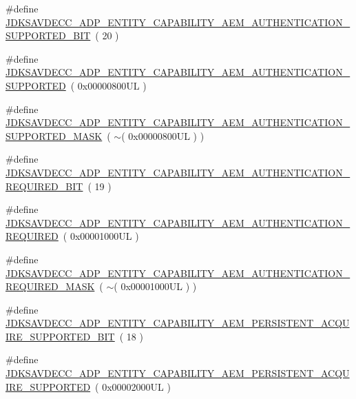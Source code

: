 \begin{DoxyCompactItemize}
\item 
\#define \hyperlink{group__adp__entity__capability_gad508c2d381e82fa1ea17b6751d49966a}{J\+D\+K\+S\+A\+V\+D\+E\+C\+C\+\_\+\+A\+D\+P\+\_\+\+E\+N\+T\+I\+T\+Y\+\_\+\+C\+A\+P\+A\+B\+I\+L\+I\+T\+Y\+\_\+\+A\+E\+M\+\_\+\+A\+U\+T\+H\+E\+N\+T\+I\+C\+A\+T\+I\+O\+N\+\_\+\+S\+U\+P\+P\+O\+R\+T\+E\+D\+\_\+\+B\+IT}~( 20 )
\item 
\#define \hyperlink{group__adp__entity__capability_gaa39be3e8ff394432d2bf6ef5ccbc7677}{J\+D\+K\+S\+A\+V\+D\+E\+C\+C\+\_\+\+A\+D\+P\+\_\+\+E\+N\+T\+I\+T\+Y\+\_\+\+C\+A\+P\+A\+B\+I\+L\+I\+T\+Y\+\_\+\+A\+E\+M\+\_\+\+A\+U\+T\+H\+E\+N\+T\+I\+C\+A\+T\+I\+O\+N\+\_\+\+S\+U\+P\+P\+O\+R\+T\+ED}~( 0x00000800\+U\+L )
\item 
\#define \hyperlink{group__adp__entity__capability_ga5dc48eda67fb232e9af9edaf5d230f7d}{J\+D\+K\+S\+A\+V\+D\+E\+C\+C\+\_\+\+A\+D\+P\+\_\+\+E\+N\+T\+I\+T\+Y\+\_\+\+C\+A\+P\+A\+B\+I\+L\+I\+T\+Y\+\_\+\+A\+E\+M\+\_\+\+A\+U\+T\+H\+E\+N\+T\+I\+C\+A\+T\+I\+O\+N\+\_\+\+S\+U\+P\+P\+O\+R\+T\+E\+D\+\_\+\+M\+A\+SK}~( $\sim$( 0x00000800\+U\+L ) )
\item 
\#define \hyperlink{group__adp__entity__capability_ga4e8b2aec5591b406eb8546cef06d1a87}{J\+D\+K\+S\+A\+V\+D\+E\+C\+C\+\_\+\+A\+D\+P\+\_\+\+E\+N\+T\+I\+T\+Y\+\_\+\+C\+A\+P\+A\+B\+I\+L\+I\+T\+Y\+\_\+\+A\+E\+M\+\_\+\+A\+U\+T\+H\+E\+N\+T\+I\+C\+A\+T\+I\+O\+N\+\_\+\+R\+E\+Q\+U\+I\+R\+E\+D\+\_\+\+B\+IT}~( 19 )
\item 
\#define \hyperlink{group__adp__entity__capability_gaca6f7914ac9ec2cc166fe64e584b47a6}{J\+D\+K\+S\+A\+V\+D\+E\+C\+C\+\_\+\+A\+D\+P\+\_\+\+E\+N\+T\+I\+T\+Y\+\_\+\+C\+A\+P\+A\+B\+I\+L\+I\+T\+Y\+\_\+\+A\+E\+M\+\_\+\+A\+U\+T\+H\+E\+N\+T\+I\+C\+A\+T\+I\+O\+N\+\_\+\+R\+E\+Q\+U\+I\+R\+ED}~( 0x00001000\+U\+L )
\item 
\#define \hyperlink{group__adp__entity__capability_ga238b754ed39778dfb7612db8f3484dc3}{J\+D\+K\+S\+A\+V\+D\+E\+C\+C\+\_\+\+A\+D\+P\+\_\+\+E\+N\+T\+I\+T\+Y\+\_\+\+C\+A\+P\+A\+B\+I\+L\+I\+T\+Y\+\_\+\+A\+E\+M\+\_\+\+A\+U\+T\+H\+E\+N\+T\+I\+C\+A\+T\+I\+O\+N\+\_\+\+R\+E\+Q\+U\+I\+R\+E\+D\+\_\+\+M\+A\+SK}~( $\sim$( 0x00001000\+U\+L ) )
\item 
\#define \hyperlink{group__adp__entity__capability_ga37d3dd73ca4fd312aab56dbb1e1030c4}{J\+D\+K\+S\+A\+V\+D\+E\+C\+C\+\_\+\+A\+D\+P\+\_\+\+E\+N\+T\+I\+T\+Y\+\_\+\+C\+A\+P\+A\+B\+I\+L\+I\+T\+Y\+\_\+\+A\+E\+M\+\_\+\+P\+E\+R\+S\+I\+S\+T\+E\+N\+T\+\_\+\+A\+C\+Q\+U\+I\+R\+E\+\_\+\+S\+U\+P\+P\+O\+R\+T\+E\+D\+\_\+\+B\+IT}~( 18 )
\item 
\#define \hyperlink{group__adp__entity__capability_ga4025131a0876b7e0fc4578528e7ab8df}{J\+D\+K\+S\+A\+V\+D\+E\+C\+C\+\_\+\+A\+D\+P\+\_\+\+E\+N\+T\+I\+T\+Y\+\_\+\+C\+A\+P\+A\+B\+I\+L\+I\+T\+Y\+\_\+\+A\+E\+M\+\_\+\+P\+E\+R\+S\+I\+S\+T\+E\+N\+T\+\_\+\+A\+C\+Q\+U\+I\+R\+E\+\_\+\+S\+U\+P\+P\+O\+R\+T\+ED}~( 0x00002000\+U\+L )

\end{DoxyCompactItemize}
